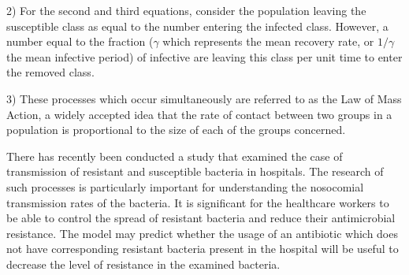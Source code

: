 2) For the second and third equations, consider the population leaving the susceptible class as equal to the number entering the infected class. However, a number equal to the fraction ($\gamma$ which represents the mean recovery rate, or $1/\gamma$ the mean infective period) of infective are leaving this class per unit time to enter the removed class.

3) These processes which occur simultaneously are referred to as the Law of Mass Action, a widely accepted idea that the rate of contact between two groups in a population is proportional to the size of each of the groups concerned\cite{per14}.

There has recently been conducted a study that examined the case of transmission of resistant and susceptible bacteria in hospitals. The research of such processes is particularly important for understanding the nosocomial transmission rates of the bacteria. It is significant for the healthcare workers to be able to control the spread of resistant bacteria and reduce their antimicrobial resistance. The model may predict whether the usage of an antibiotic which does not have corresponding resistant bacteria present in the hospital will be useful to decrease the level of resistance in the examined bacteria.
